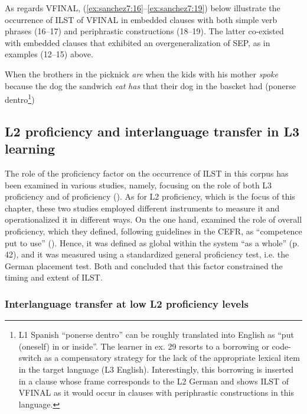 \documentclass[output=paper,modfonts,nonflat, newtxmath]{langsci/langscibook}
\begin{document}
As regards VFINAL, (\ref{ex:sanchez7:16}--\ref{ex:sanchez7:19}) below illustrate the occurrence of ILST of VFINAL in embedded clauses with both simple verb phrases (16--17) and periphrastic constructions (18--19). The latter co-existed with embedded clauses that exhibited an overgeneralization of SEP, as in examples (12--15) above.

\ea%
  \label{ex:sanchez7:16}
  When the brothers in the picknick {\textit{are}}
\ex %
  \label{ex:sanchez7:17}
  when the kids with his mother {\textit{spoke}}
\ex %
  \label{ex:sanchez7:18}
  	because the dog the sandwich {\textit{eat}} {\textit{has}}
\ex %
  \label{ex:sanchez7:19}
  that their dog in the bascket {{had}} ({{ponerse} {dentro}}\footnote{L1 Spanish “ponerse dentro” can be roughly translated into English as “put (oneself) in or inside”. The learner in ex. 29 resorts to a borrowing or code-switch as a compensatory strategy for the lack of the appropriate lexical item in the target language (L3 English). Interestingly, this borrowing is inserted in a clause whose frame corresponds to the L2 German and shows ILST of VFINAL as it would occur in clauses with periphrastic constructions in this language.})
\z


\subsection{{L2} {proficiency} {and} {interlanguage} {transfer} {in} {L3} {learning}}%


The role of the proficiency factor on the occurrence of ILST in this corpus has been examined in various studies, namely, focusing on the role of both L3 proficiency \citep{Sánchez2014} and of proficiency (\citealt{Sánchez2011, SánchezBardel2017}). As for L2 proficiency, which is the focus of this chapter, these two studies employed different instruments to measure it and operationalized it in different ways. On the one hand, \citet{SánchezBardel2017} examined the role of {overall} proficiency, which they defined, following guidelines in the CEFR, as “competence put to use” (\citealt[187]{CouncilofEurope2001}). Hence, it was defined as global within the system “as a whole” (p. 42), and it was measured using a standardized general proficiency test, i.e. the German placement test. Both \citet{Sánchez2011} and \citet{SánchezBardel2017} concluded that this factor constrained the timing and extent of ILST.

\subsubsection{Interlanguage transfer at low L2 proficiency levels}%
\end{document}
